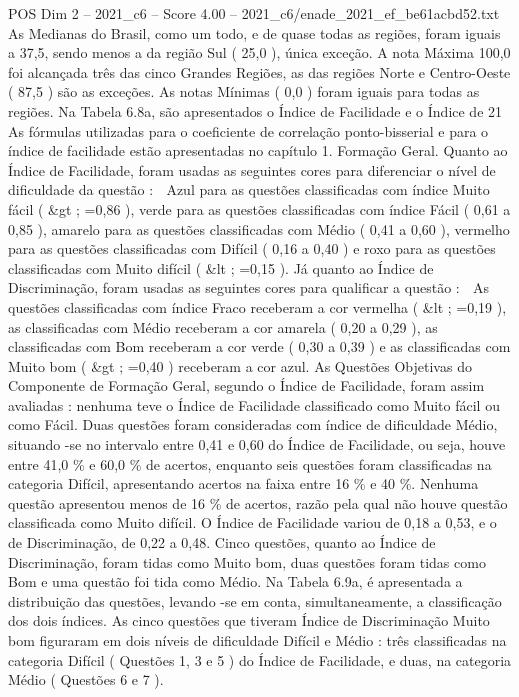 \begin{textsample}{POS Dim 2 – 2021\_c6 – Score 4.00 – 2021\_c6/enade\_2021\_ef\_be61acbd52.txt}
As Medianas do Brasil, como um todo, e de quase todas as regiões, foram iguais a 37,5, sendo menos a da região Sul ( 25,0 ), única exceção.
A nota Máxima 100,0 foi alcançada três das cinco Grandes Regiões, as das regiões Norte e Centro-Oeste ( 87,5 ) são as exceções.
As notas Mínimas ( 0,0 ) foram iguais para todas as regiões.
Na Tabela 6.8a, são apresentados o Índice de Facilidade e o Índice de 21 As fórmulas utilizadas para o coeficiente de correlação ponto-bisserial e para o índice de facilidade estão apresentadas no capítulo 1.
Formação Geral.
Quanto ao Índice de Facilidade, foram usadas as seguintes cores para diferenciar o nível de dificuldade da questão :  Azul para as questões classificadas com índice Muito fácil ( \&gt ; =0,86 ), verde para as questões classificadas com índice Fácil ( 0,61 a 0,85 ), amarelo para as questões classificadas com Médio ( 0,41 a 0,60 ), vermelho para as questões classificadas com Difícil ( 0,16 a 0,40 ) e roxo para as questões classificadas com Muito difícil ( \&lt ; =0,15 ).
Já quanto ao Índice de Discriminação, foram usadas as seguintes cores para qualificar a questão :  As questões classificadas com índice Fraco receberam a cor vermelha ( \&lt ; =0,19 ), as classificadas com Médio receberam a cor amarela ( 0,20 a 0,29 ), as classificadas com Bom receberam a cor verde ( 0,30 a 0,39 ) e as classificadas com Muito bom ( \&gt ; =0,40 ) receberam a cor azul.
As Questões Objetivas do Componente de Formação Geral, segundo o Índice de Facilidade, foram assim avaliadas : nenhuma teve o Índice de Facilidade classificado como Muito fácil ou como Fácil.
Duas questões foram consideradas com índice de dificuldade Médio, situando -se no intervalo entre 0,41 e 0,60 do Índice de Facilidade, ou seja, houve entre 41,0 \% e 60,0 \% de acertos, enquanto seis questões foram classificadas na categoria Difícil, apresentando acertos na faixa entre 16 \% e 40 \%.
Nenhuma questão apresentou menos de 16 \% de acertos, razão pela qual não houve questão classificada como Muito difícil.
O Índice de Facilidade variou de 0,18 a 0,53, e o de Discriminação, de 0,22 a 0,48.
Cinco questões, quanto ao Índice de Discriminação, foram tidas como Muito bom, duas questões foram tidas como Bom e uma questão foi tida como Médio.
Na Tabela 6.9a, é apresentada a distribuição das questões, levando -se em conta, simultaneamente, a classificação dos dois índices.
As cinco questões que tiveram Índice de Discriminação Muito bom figuraram em dois níveis de dificuldade Difícil e Médio : três classificadas na categoria Difícil ( Questões 1, 3 e 5 ) do Índice de Facilidade, e duas, na categoria Médio ( Questões 6 e 7 ).

\end{textsample}
